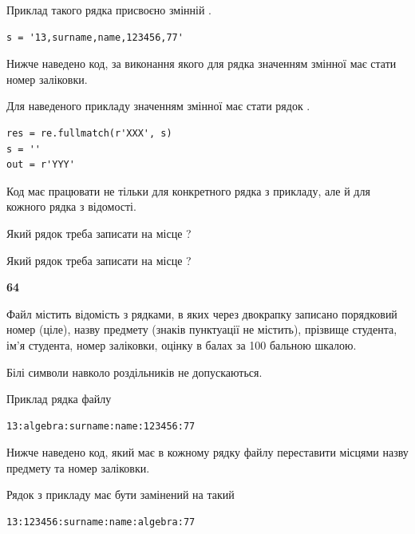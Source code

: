 Приклад такого рядка присвоєно змінній .



\begin{verbatim}
s = '13,surname,name,123456,77'
\end{verbatim}


Нижче наведено код, за виконання якого для рядка  значенням змінної  має стати номер заліковки.

Для наведеного прикладу значенням змінної  має стати рядок  .



\begin{verbatim}
res = re.fullmatch(r'XXX', s)
s = ''
out = r'YYY'
\end{verbatim}


Код має працювати не тільки для конкретного рядка з прикладу, але й для кожного рядка з відомості.




Який рядок треба записати на місце  ?\par
\vspace{5mm}


Який рядок треба записати на місце  ?\par


\newpage

{\begin {center}\textbf{ 64}\end {center}}\par
Файл  містить відомість з рядками, в яких через двокрапку записано поряд\-ковий номер (ціле), назву предмету (знаків пунктуації не містить), прізвище студента, ім'я студента, номер заліковки, оцінку в балах за 100 бальною шкалою.

Білі символи навколо роздільників не допускаються.

Приклад рядка файлу



\begin{verbatim}
13:algebra:surname:name:123456:77
\end{verbatim}


Нижче наведено код, який має в кожному рядку файлу переставити місцями назву предмету та номер заліковки.

Рядок з прикладу має бути замінений на такий



\begin{verbatim}
13:123456:surname:name:algebra:77
\end{verbatim}




